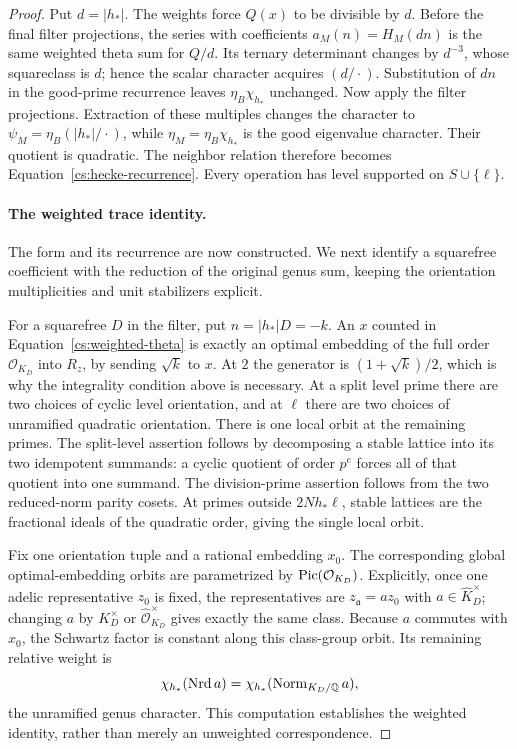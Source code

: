 \begin{proof}
Put $d=|h_*|$. The weights force $Q(x)$ to be divisible by $d$.
Before the final filter projections, the series with coefficients
$a_M(n)=H_M(dn)$ is the same weighted theta sum for $Q/d$.
Its ternary determinant changes by $d^{-3}$, whose squareclass is $d$;
hence the scalar character acquires $(d/\cdot)$.
Substitution of $dn$ in the good-prime recurrence leaves
$\eta_B\chi_{h_*}$ unchanged. Now apply the filter projections.
Extraction of these multiples changes the character to
$\psi_M=\eta_B( |h_*|/\cdot)$, while
$\eta_M=\eta_B\chi_{h_*}$ is the good eigenvalue character.
Their quotient is quadratic.  The neighbor relation therefore becomes
Equation~\eqref{cs:hecke-recurrence}.  Every operation has level supported
on $S\cup\{\ell\}$.

\paragraph{The weighted trace identity.}
The form and its recurrence are now constructed. We next identify a
squarefree coefficient with the reduction of the original genus sum,
keeping the orientation multiplicities and unit stabilizers explicit.

For a squarefree $D$ in the filter, put $n=|h_*|D=-k$.
An $x$ counted in Equation~\eqref{cs:weighted-theta} is exactly an
optimal embedding of the full order $\mathcal O_{K_D}$ into $R_z$,
by sending $\sqrt{k}$ to $x$.  At $2$ the generator is
$(1+\sqrt{k})/2$, which is why the integrality condition above is
necessary.  At a split level prime there are two choices of cyclic
level orientation, and at $\ell$ there are two choices of unramified
quadratic orientation.  There is one local orbit at the remaining
primes.  The split-level assertion follows by decomposing a stable
lattice into its two idempotent summands: a cyclic quotient of order
$p^e$ forces all of that quotient into one summand.  The division-prime
assertion follows from the two reduced-norm parity cosets.  At primes outside $2Nh_*\ell$,
stable lattices are the fractional ideals of the quadratic
order, giving the single local orbit.

Fix one orientation tuple and a rational embedding $x_0$.  The
corresponding global optimal-embedding orbits are parametrized by
$\operatorname{Pic}(\mathcal O_{K_D})$.  Explicitly, once one adelic representative
$z_0$ is fixed, the representatives are $z_{\mathfrak a}=a z_0$ with
$a\in\widehat K_D^\times$; changing $a$ by $K_D^\times$ or
$\widehat{\mathcal O}_{K_D}^{\times}$ gives exactly the same class.
Because $a$ commutes with $x_0$, the Schwartz factor is constant along
this class-group orbit.  Its remaining relative weight is
\[
             \chi_{h_*}(\operatorname{Nrd} a)
              =\chi_{h_*}(\operatorname{Norm}_{K_D/\mathbb Q}a),
\]
the unramified genus character.  This computation establishes the
weighted identity, rather than merely an unweighted correspondence.


\end{proof}
